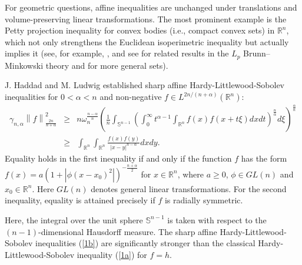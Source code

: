 \documentclass[preprint,12pt]{elsarticle}
\begin{document}
	For geometric questions, affine inequalities are unchanged under translations and
	volume-preserving linear transformations. The most prominent example is the Petty projection inequality for convex bodies (i.e.,
	compact convex sets) in $\mathbb{R}^n$, which not only strengthens the Euclidean isoperimetric
	inequality but actually implies it (see, for example, \cite{BKJ13,CLYZ09,R. Gardner06,M.Ludwig2002,Schneider14}, and see \cite{AAKM04,CDDFH19,HS09,HaberlS09,JM2025,JM22-,ELDZ2000,ELDZ2002,Lin17,LX21,MilmanY,QV17,Nguyen16,T.Wang12,WX20,GZhang99} for related results in the ${L}_{p}$ Brunn–Minkowski theory and for more general sets). 
	
	J. Haddad and M. Ludwig \cite[Theorem 1]{JM22} established sharp affine Hardy-Littlewood-Sobolev inequalities for $0<\alpha <n$ and non-negative $f\in {L}^{2n/(n+\alpha)} (\mathbb{R}^n)$:
	\begin{eqnarray}\label{1b}
		\gamma _{n,\alpha }\left \| f \right \|_{\frac{2n}{n+  \alpha } }^{2}&\ge& n\omega _{n}^{\frac{n-\alpha }{n} }\left ( \frac{1}{n}\int_{\mathbb{S}^{n-1} }\left ( \int_{0}^{\infty }t^{\alpha -1}  \int_{\mathbb{R}^n }f\left ( x \right )f\left ( x+  t\xi  \right )dxdt  \right )^{\frac{n}{\alpha }}   d\xi\right )^{\frac{\alpha }{n} }\nonumber\\
		&\ge& \int_{\mathbb{R}^n } \int_{\mathbb{R}^n }\frac{f\left ( x \right )f\left ( y \right )  }{\left | x-y \right |^{n-\alpha }  }dxdy. 
	\end{eqnarray}
	 Equality holds in the first inequality if and only if the function $f$ has the form  $f\left( x \right )=a\left ( 1+\left | \phi\left( x-x_{0} \right )^{2}  \right|\right )^{-\frac{n+\alpha }{2} }$ for $x\in \mathbb{R}^n$, where $a\ge0$, $\phi\in GL\left ( n \right )$ and $x_{0}\in \mathbb{R}^n$. Here $GL(n)$ denotes general linear transformations.  For the second inequality, equality is attained precisely if $f$ is radially symmetric. 
	
	Here, the integral over the unit sphere $\mathbb{S}^{n-1}$ is taken with respect to the $(n-1)$-dimensional Hausdorff measure. The sharp affine Hardy-Littlewood-Sobolev inequalities (\ref{1b}) are significantly stronger than the classical Hardy-Littlewood-Sobolev inequality (\ref{1a}) for $f=h$.
	
\end{document}
